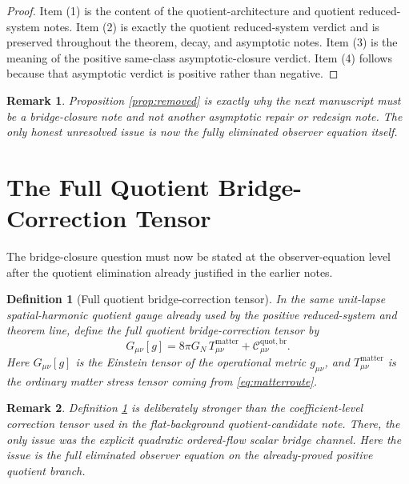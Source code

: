 \documentclass[11pt]{article}
\newcommand{\BridgeCorr}{\mathcal C_{\mu\nu}^{\mathrm{quot,br}}}
\newtheorem{definition}{Definition}
\newtheorem{remark}{Remark}
\begin{document}
\begin{proof}
Item (1) is the content of the quotient-architecture and quotient reduced-system notes. Item (2) is exactly the quotient reduced-system verdict and is preserved throughout the theorem, decay, and asymptotic notes. Item (3) is the meaning of the positive same-class asymptotic-closure verdict. Item (4) follows because that asymptotic verdict is positive rather than negative.
\end{proof}

\begin{remark}
Proposition \ref{prop:removed} is exactly why the next manuscript must be a bridge-closure note and not another asymptotic repair or redesign note. The only honest unresolved issue is now the fully eliminated observer equation itself.
\end{remark}

\section{The Full Quotient Bridge-Correction Tensor}

The bridge-closure question must now be stated at the observer-equation level after the quotient elimination already justified in the earlier notes.

\begin{definition}[Full quotient bridge-correction tensor]
\label{def:C}
In the same unit-lapse spatial-harmonic quotient gauge already used by the positive reduced-system and theorem line, define the \emph{full quotient bridge-correction tensor} by
\begin{equation}
G_{\mu\nu}[g]
=
8\pi G_N\,T_{\mu\nu}^{\mathrm{matter}}
+ \BridgeCorr.
\label{eq:bridgeeq}
\end{equation}
Here \(G_{\mu\nu}[g]\) is the Einstein tensor of the operational metric \(g_{\mu\nu}\), and \(T_{\mu\nu}^{\mathrm{matter}}\) is the ordinary matter stress tensor coming from \eqref{eq:matterroute}.
\end{definition}

\begin{remark}
Definition \ref{def:C} is deliberately stronger than the coefficient-level correction tensor used in the flat-background quotient-candidate note. There, the only issue was the explicit quadratic ordered-flow scalar bridge channel. Here the issue is the full eliminated observer equation on the already-proved positive quotient branch.
\end{remark}
\end{document}
